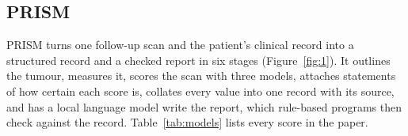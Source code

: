 \subsection{PRISM}\label{sec:2.2}

PRISM turns one follow-up scan and the patient's clinical record into a structured record and a checked report in
six stages (Figure~\ref{fig:1}). It outlines the tumour, measures it, scores the scan with three models, attaches
statements of how certain each score is, collates every value into one record with its source, and has a local
language model write the report, which rule-based programs then check against the record. Table~\ref{tab:models}
lists every score in the paper.

